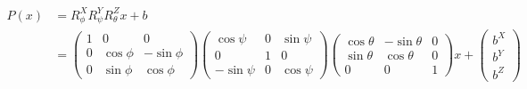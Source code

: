     \begin{align*}
        P(x) & = R^X_{\phi} R^Y_{\psi} R^Z_{\theta} x + b \\
        & =
        \begin{pmatrix}
        1 & 0 & 0 \\
        0 & \cos{\phi} & -\sin{\phi} \\
        0 & \sin{\phi} & \cos{\phi}
        \end{pmatrix}
        \begin{pmatrix}
        \cos{\psi} & 0 & \sin{\psi} \\
        0 & 1 & 0 \\
        -\sin{\psi} & 0 & \cos{\psi}
        \end{pmatrix}
        \begin{pmatrix}
        \cos{\theta} & -\sin{\theta} & 0 \\
        \sin{\theta} & \cos{\theta} & 0 \\
        0 & 0 & 1
        \end{pmatrix}
        x +
        \begin{pmatrix}
        b^X \\
        b^Y \\
        b^Z
        \end{pmatrix}
    \end{align*}